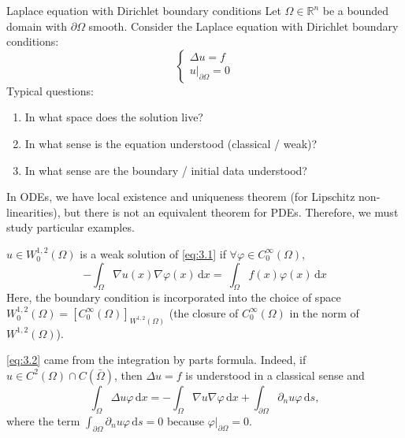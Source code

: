 \documentclass{report}
\begin{document}
\begin{example}{Laplace equation with Dirichlet boundary conditions}{}
    Let \(\Omega \in \mathbb{R}^{n}\) be a bounded domain with \(\partial \Omega\) smooth. Consider the Laplace equation with Dirichlet boundary conditions:
    \begin{equation}\label{eq:3.1}
        \begin{cases}
            \Delta u = f \\
            \left. u \right|_{\partial \Omega} = 0
        \end{cases}
    \end{equation}
    Typical questions: 
    \begin{enumerate}
        \item In what space does the solution live?
        \item In what sense is the equation understood (classical / weak)?
        \item In what sense are the boundary / initial data understood?
    \end{enumerate}
    In ODEs, we have local existence and uniqueness theorem (for Lipschitz non-linearities), but there is not an equivalent theorem for PDEs. Therefore, we must study particular examples.
\end{example}

\begin{definition}{}{}
    \(u \in W^{1, 2}_{0}(\Omega)\) is a weak solution of \ref{eq:3.1} if \(\forall \varphi \in C^{\infty}_{0}(\Omega)\),
    \begin{equation}\label{eq:3.2}
        - \int_{\Omega} \nabla u(x) \nabla \varphi(x) \,\mathrm{d}x = \ \int_{\Omega} f(x) \varphi(x) \,\mathrm{d}x
    \end{equation}
    Here, the boundary condition is incorporated into the choice of space \(W^{1, 2}_{0}(\Omega) = [C^{\infty}_{0}(\Omega)]_{W^{1, 2}(\Omega)}\) (the closure of \(C^{\infty}_{0}(\Omega)\) in the norm of \(W^{1, 2}(\Omega)\)). 

    \ref{eq:3.2} came from the integration by parts formula. Indeed, if \(u \in C^{2}(\Omega) \cap C(\bar{\Omega})\), then \(\Delta u = f\) is understood in a classical sense and
    \[
        \int_{\Omega} \Delta u \varphi \,\mathrm{d}x = - \int_{\Omega} \nabla u \nabla \varphi \,\mathrm{d}x + \int_{\partial\Omega} \partial_{n} u \varphi \,\mathrm{d}s,
    \]
    where the term \(\int_{\partial\Omega} \partial_{n} u \varphi \,\mathrm{d}s = 0\) because \(\left. \varphi \right|_{\partial \Omega} = 0\).
\end{definition}
\end{document}
